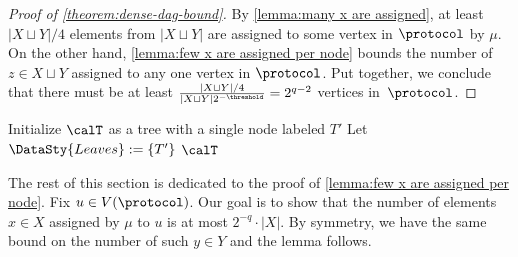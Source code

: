 \begin{proof}[Proof of \autoref{theorem:dense-dag-bound}]
     By \autoref{lemma:many x are assigned}, at least $\lvert X\sqcup Y\rvert/4$ elements from $\lvert X\sqcup Y\rvert$ are assigned to some vertex in $\protocol$ by $\mu$. On the other hand, \autoref{lemma:few x are assigned per node} bounds the number of $z \in X\sqcup Y$ assigned to any one vertex in $\protocol$. Put together, we conclude that there must be at least $\frac{\lvert X\sqcup Y \rvert/4}{\lvert X \sqcup Y\rvert 2^{-\threshold}} = 2^{q-2}$ vertices in~$\protocol$.
\end{proof}

    \begin{algorithm2e}[t]

    Initialize $\calT$ as a tree with a single node labeled $T'$\;
    Let $\DataSty{Leaves}:= \{T'\}$\;
     $\calT$
    \caption{Definition of a tree $\calT$ of potential coverings of $T'^x$}  
    \label{alg:2}
    \end{algorithm2e}


The rest of this section is dedicated to the proof of \autoref{lemma:few x are assigned per node}. 
    Fix $u\in V(\protocol)$. Our goal is to show that the number of elements $x\in X$ assigned by $\mu$ to $u$ is at most $2^{-q} \cdot |X|$. By symmetry, we have the same bound on the number of such $y\in Y$ and the lemma follows. 
    
